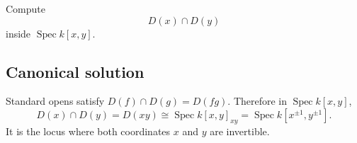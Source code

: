 
\begin{exercise}
	Compute
	\[
	D(x)\cap D(y)
	\]
	inside \(\operatorname{Spec} k[x,y]\).
\end{exercise}

\subsection*{Canonical solution}
Standard opens satisfy $D(f)\cap D(g)=D(fg)$. Therefore in $\operatorname{Spec} k[x,y]$,
\[
D(x)\cap D(y)=D(xy)\cong\operatorname{Spec} k[x,y]_{xy}=\operatorname{Spec} k[x^{\pm1},y^{\pm1}].
\]
It is the locus where both coordinates $x$ and $y$ are invertible.
